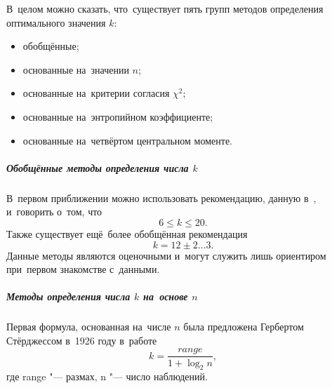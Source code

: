 \documentclass[]{scrartcl}
\begin{document}
В~целом можно сказать, что~существует пять групп методов определения оптимального значения $k$:
	\begin{itemize}
		\item обобщённые;
		\item основанные на~значении $n$;
		\item основанные на~критерии согласия $\chi^{2}$;
		\item основанные на~энтропийном коэффициенте;
		\item основанные на~четвёртом центральном моменте.
	\end{itemize}
\subparagraph{Обобщённые методы определения числа $k$}\label{k-hist:common-methods}
\par
В~первом приближении можно использовать рекомендацию, данную в~\cite{Shtorm:MathStat}, и~говорить о~том, что
\begin{equation}\label{n-k-Nowiczkij-1}
6 \leq k \leq 20.
\end{equation}
Также существует ещё~более обобщённая рекомендация
\begin{equation}\label{n-k-Nowiczkij-2}
k = 12 \pm 2 \ldots 3.
\end{equation}
Данные методы являются оценочными и~могут служить лишь ориентиром при~первом знакомстве с~данными.
\subparagraph{Методы определения числа $k$ на~основе $n$}\label{k-hist:n-methods}
\par
Первая формула, основанная на~числе $n$ была предложена Гербертом Стёрджессом в~1926 году в~работе~\cite{Sturgess:hist-intervals}
\begin{equation}\label{eq:hist_Sturgess-1}
k = \frac{range}{1 + \log_2 n},
\end{equation}
где \foreignlanguage{english}{range} "--- размах,
n "--- число наблюдений.
\end{document}
